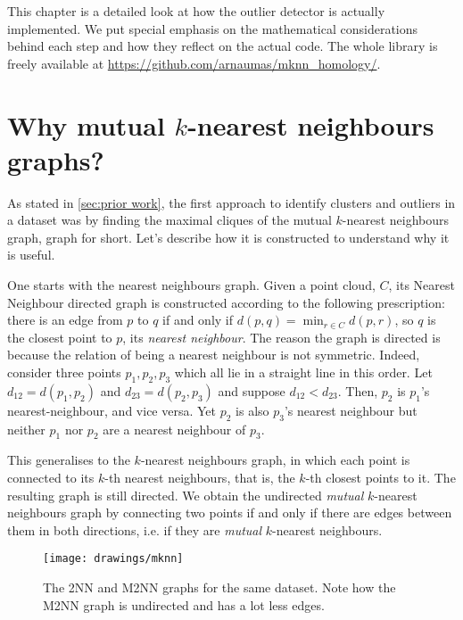 \documentclass[../main.tex]{subfiles}
\begin{document}
This chapter is a detailed look at how the outlier detector is actually implemented. We
put special emphasis on the mathematical considerations behind each step and how they
reflect on the actual code. The whole library is freely available at \url{https://github.com/arnaumas/mknn_homology/}. 

\section{Why mutual \texorpdfstring{\( k \)}{k}-nearest neighbours graphs?}
As stated in \cref{sec:prior work}, the first approach to identify clusters and outliers
in a dataset was by finding the maximal cliques of the mutual \( k \)-nearest neighbours
graph, \MKNN graph for short. Let's describe how it is constructed to understand why it is
useful. 

One starts with the nearest neighbours graph. Given a point cloud, \( C
\), its Nearest Neighbour directed graph is constructed according to the following
prescription: there is an edge from \( p \) to \( q \) if and only if \( d(p,q) = \min_{r
	\in C} d(p,r) \), so \( q \) is the closest point to \( p \), its \emph{nearest
neighbour}. The reason the graph is directed is because the relation of being a nearest
neighbour is not symmetric. Indeed, consider three points \( p_1, p_2, p_3 \) which all
lie in a straight line in this order. Let \( d_{12} = d(p_1, p_2) \)  and \( d_{23} =
d(p_2,p_3) \) and suppose \( d_{12} < d_{23} \). Then, \( p_2 \) is \( p_1 \)'s
nearest-neighbour, and vice versa. Yet \( p_2 \) is also \( p_3 \)'s nearest neighbour but
neither \( p_1 \) nor \( p_2 \) are a nearest neighbour of \( p_3 \).

This generalises to the \( k \)-nearest neighbours graph, in which each point is connected
to its \( k \)-th nearest neighbours, that is, the \( k \)-th closest points to it. The
resulting graph is still directed. We obtain the undirected \emph{mutual} \( k \)-nearest
neighbours graph by connecting two points if and only if there are edges between them
in both directions, i.e. if they are \emph{mutual} \( k \)-nearest neighbours. 

\begin{figure}[htb]
	\centering
	\texttt{[image: drawings/mknn]}
	\caption{The 2NN and M2NN graphs for the same dataset. Note how the M2NN graph is
	undirected and has a lot less edges.}
	\label{fig:mknn}
\end{figure}
\end{document}
